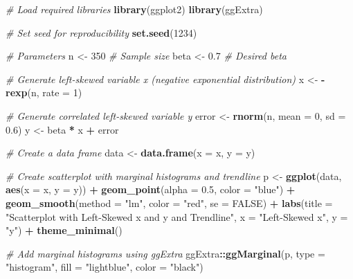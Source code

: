 \documentclass[
]{book}
\newenvironment{Shaded}{\begin{snugshade}}{\end{snugshade}}
\newcommand{\AttributeTok}[1]{\textcolor[rgb]{0.13,0.29,0.53}{#1}}
\newcommand{\CommentTok}[1]{\textcolor[rgb]{0.56,0.35,0.01}{\textit{#1}}}
\newcommand{\ConstantTok}[1]{\textcolor[rgb]{0.56,0.35,0.01}{#1}}
\newcommand{\DecValTok}[1]{\textcolor[rgb]{0.00,0.00,0.81}{#1}}
\newcommand{\FloatTok}[1]{\textcolor[rgb]{0.00,0.00,0.81}{#1}}
\newcommand{\FunctionTok}[1]{\textcolor[rgb]{0.13,0.29,0.53}{\textbf{#1}}}
\newcommand{\NormalTok}[1]{#1}
\newcommand{\OtherTok}[1]{\textcolor[rgb]{0.56,0.35,0.01}{#1}}
\newcommand{\SpecialCharTok}[1]{\textcolor[rgb]{0.81,0.36,0.00}{\textbf{#1}}}
\newcommand{\StringTok}[1]{\textcolor[rgb]{0.31,0.60,0.02}{#1}}
\begin{document}
\begin{Shaded}
\begin{Highlighting}[]
\CommentTok{\# Load required libraries}
\FunctionTok{library}\NormalTok{(ggplot2)}
\FunctionTok{library}\NormalTok{(ggExtra)}

\CommentTok{\# Set seed for reproducibility}
\FunctionTok{set.seed}\NormalTok{(}\DecValTok{1234}\NormalTok{)}

\CommentTok{\# Parameters}
\NormalTok{n }\OtherTok{\textless{}{-}} \DecValTok{350}  \CommentTok{\# Sample size}
\NormalTok{beta }\OtherTok{\textless{}{-}} \FloatTok{0.7}  \CommentTok{\# Desired beta}

\CommentTok{\# Generate left{-}skewed variable x (negative exponential distribution)}
\NormalTok{x }\OtherTok{\textless{}{-}} \SpecialCharTok{{-}}\FunctionTok{rexp}\NormalTok{(n, }\AttributeTok{rate =} \DecValTok{1}\NormalTok{)}

\CommentTok{\# Generate correlated left{-}skewed variable y}
\NormalTok{error }\OtherTok{\textless{}{-}} \FunctionTok{rnorm}\NormalTok{(n, }\AttributeTok{mean =} \DecValTok{0}\NormalTok{, }\AttributeTok{sd =} \FloatTok{0.6}\NormalTok{)}
\NormalTok{y }\OtherTok{\textless{}{-}}\NormalTok{ beta }\SpecialCharTok{*}\NormalTok{ x }\SpecialCharTok{+}\NormalTok{ error}

\CommentTok{\# Create a data frame}
\NormalTok{data }\OtherTok{\textless{}{-}} \FunctionTok{data.frame}\NormalTok{(}\AttributeTok{x =}\NormalTok{ x, }\AttributeTok{y =}\NormalTok{ y)}

\CommentTok{\# Create scatterplot with marginal histograms and trendline}
\NormalTok{p }\OtherTok{\textless{}{-}} \FunctionTok{ggplot}\NormalTok{(data, }\FunctionTok{aes}\NormalTok{(}\AttributeTok{x =}\NormalTok{ x, }\AttributeTok{y =}\NormalTok{ y)) }\SpecialCharTok{+}
  \FunctionTok{geom\_point}\NormalTok{(}\AttributeTok{alpha =} \FloatTok{0.5}\NormalTok{, }\AttributeTok{color =} \StringTok{"blue"}\NormalTok{) }\SpecialCharTok{+}
  \FunctionTok{geom\_smooth}\NormalTok{(}\AttributeTok{method =} \StringTok{"lm"}\NormalTok{, }\AttributeTok{color =} \StringTok{"red"}\NormalTok{, }\AttributeTok{se =} \ConstantTok{FALSE}\NormalTok{) }\SpecialCharTok{+}
  \FunctionTok{labs}\NormalTok{(}\AttributeTok{title =} \StringTok{"Scatterplot with Left{-}Skewed x and y and Trendline"}\NormalTok{,}
       \AttributeTok{x =} \StringTok{"Left{-}Skewed x"}\NormalTok{, }\AttributeTok{y =} \StringTok{"y"}\NormalTok{) }\SpecialCharTok{+}
  \FunctionTok{theme\_minimal}\NormalTok{()}

\CommentTok{\# Add marginal histograms using ggExtra}
\NormalTok{ggExtra}\SpecialCharTok{::}\FunctionTok{ggMarginal}\NormalTok{(p, }\AttributeTok{type =} \StringTok{"histogram"}\NormalTok{, }\AttributeTok{fill =} \StringTok{"lightblue"}\NormalTok{, }\AttributeTok{color =} \StringTok{"black"}\NormalTok{)}
\end{Highlighting}
\end{Shaded}
\end{document}
